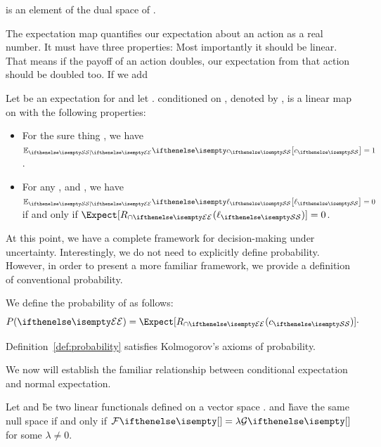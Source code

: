 \begin{proposition}
    \Expect is an element of the dual space of \actionSet.
\end{proposition}

The expectation map quantifies our expectation about an action as a real number.
It must have three properties:
Most importantly it should be linear.
That means if the payoff of an action doubles, our expectation from that action should be doubled too.
If we add


\begin{definition} 
    Let \Expect be an expectation for \sampleSet and let \eventInS.
    \Expect conditioned on \event, denoted by \ExpectOnE, is a linear map on \sampleSet with the following properties:
    \begin{itemize}
        \item For the sure thing \sure, we have $\ExpectOnE[{\sure}] = 1$.
        \item For any \inA{\act}, and \eventInS,
        we have $\ExpectOnE[{\act}] = 0$ if and only if $\Expect[\rstOp(\act)] = 0$.
    \end{itemize}
\end{definition}

At this point, we have a complete framework for decision-making under uncertainty.
Interestingly, we do not need to explicitly define probability.
However, in order to present a more familiar framework, we provide a definition of conventional probability.

\begin{definition} [Probability]
    \label{def:probability}
    We define the probability of \eventInS as follows:
    \[
        P(\event) = \Expect[\rstOp(\sure)] \cdot
    \]
\end{definition}

\begin{theorem}
    Definition~\ref{def:probability} satisfies Kolmogorov's axioms of probability.
\end{theorem}

We now will establish the familiar relationship between conditional expectation and normal expectation.

\begin{lemma}
    \label{lm:scale}
    Let \F and \G be two linear functionals defined on a vector space .
    \F and \G have the same null space if and only if $\F = \lambda \G$ for some $\lambda \neq 0$.
\end{lemma}

